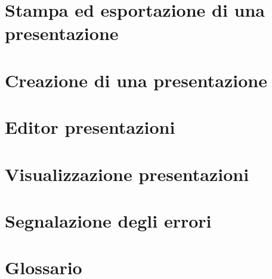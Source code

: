 \section{Stampa ed esportazione di una presentazione}



\section{Creazione di una presentazione}

\newpage


\section{Editor presentazioni}

\newpage


\section{Visualizzazione presentazioni}

\newpage

\section{Segnalazione degli errori}

\newpage


\section{Glossario}

\newpage





